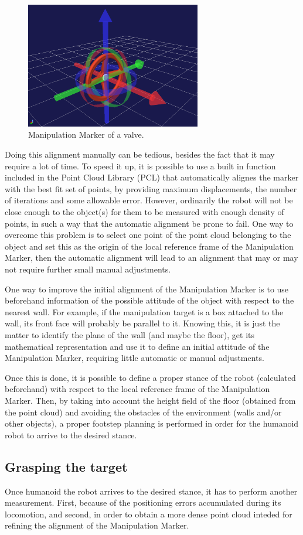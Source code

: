 		\begin{figure}[b]
			\centering
			\includegraphics[height = 5.5cm]{img/ManipulationMarker}
			\caption{Manipulation Marker of a valve.}
			\label{fig:ManipulationMarker}
		\end{figure}

		Doing this alignment manually can be tedious, besides the fact that it may require a lot of time.
		To speed it up, it is possible to use a built in function included in the Point Cloud Library (PCL) that
		automatically alignes the marker with the best fit set of points, by providing maximum displacements,
		the number of iterations and some allowable error.
		However, ordinarily the robot will not be close enough to the object(s) for them to be measured with enough
		density of points, in such a way that the automatic alignment be prone to fail.
		One way to overcome this problem is to select one point of the point cloud belonging to the object and set
		this as the origin of the local reference frame of the Manipulation Marker, then the automatic alignment
		will lead to an alignment that may or may not require further small manual adjustments.
		
		One way to improve the initial alignment of the Manipulation Marker is to use beforehand information of the
		possible attitude of the object with respect to the nearest wall.
		For example, if the manipulation target is a box attached to the wall, its front face will probably be
		parallel to it.
		Knowing this, it is just the matter to identify the plane of the wall (and maybe the floor),
		get its mathematical representation and use it to define an initial attitude of the Manipulation Marker,
		requiring little automatic or manual adjustments.
		
		Once this is done, it is possible to define a proper stance of the robot (calculated beforehand) with respect
		to the local reference frame of the Manipulation Marker.
		Then, by taking into account the height field of the floor (obtained from the point cloud) and avoiding the
		obstacles of the environment (walls and/or other objects), a proper footstep planning is performed in order
		for the humanoid robot to arrive to the desired stance.
		
	\subsection{Grasping the target}
		
		Once humanoid the robot arrives to the desired stance, it has to perform another measurement.
		First, because of the positioning errors accumulated during its locomotion, and second,
		in order to obtain a more dense point cloud inteded for refining the alignment of the Manipulation Marker.